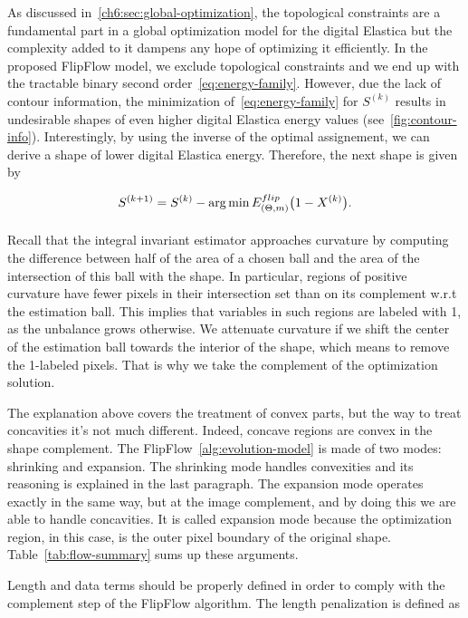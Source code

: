 As discussed in~\cref{ch6:sec:global-optimization}, the topological constraints are a fundamental part in a global optimization model for the digital Elastica but the complexity added to it dampens any hope of optimizing it efficiently. In the proposed FlipFlow model, we exclude topological constraints and we end up with the tractable binary second order~\cref{eq:energy-family}. However, due the lack of contour information, the minimization of~\cref{eq:energy-family} for $S^{(k)}$ results in undesirable shapes of even higher digital Elastica energy values  (see~\cref{fig:contour-info}). Interestingly, by using the inverse of the optimal assignement, we can derive a shape of lower digital Elastica energy. Therefore, the next shape is given by

\begin{align*}
	S^{(k+1)} = S^{(k)} - \operatorname*{arg\,min} _{}{E_{(\Theta,m)}^{flip}\big(1-X^{(k)}} \big).
\end{align*}

Recall that the integral invariant estimator approaches curvature by computing the difference between half of the area
of a chosen ball and the area of the intersection of this ball with the shape.  In particular, regions of positive
curvature have fewer pixels in their intersection set than on its complement w.r.t the estimation ball. This implies
that variables in such regions are labeled with 1, as the unbalance grows otherwise. We attenuate curvature if we shift
the center of the estimation ball towards the interior of the shape, which means to remove the 1-labeled pixels. That is
why we take the complement of the optimization solution.


The explanation above covers the treatment of convex parts, but the way to treat concavities it's not much different. Indeed, concave regions are convex in the shape complement. The FlipFlow~\cref{alg:evolution-model} is made of two modes: shrinking and expansion. The shrinking mode handles convexities and its reasoning is explained in the last paragraph. The expansion mode operates exactly in the same way, but at the image complement, and by doing this we are able to handle
concavities. It is called expansion mode because the optimization region, in this case, is the outer pixel boundary of
the original shape. Table~\cref{tab:flow-summary} sums up these arguments.

Length and data terms should be properly defined in order to comply with the complement step of the FlipFlow
algorithm. The length penalization is defined as

